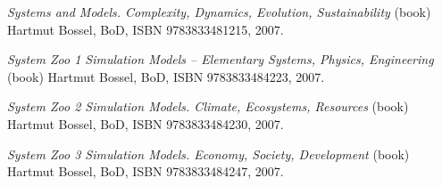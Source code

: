 \item
{\it Systems and Models. Complexity, Dynamics, Evolution, Sustainability} (book)\crlf
Hartmut Bossel, BoD, ISBN 9783833481215, 2007.

\item
{\it System Zoo 1 Simulation Models -- Elementary Systems, Physics, Engineering} (book)\crlf
Hartmut Bossel, BoD, ISBN 9783833484223, 2007.

\item
{\it System Zoo 2 Simulation Models. Climate, Ecosystems, Resources} (book)\crlf
Hartmut Bossel, BoD, ISBN 9783833484230, 2007.

\item
{\it System Zoo 3 Simulation Models. Economy, Society, Development} (book)\crlf
Hartmut Bossel, BoD, ISBN 9783833484247, 2007.
\stopitemize

